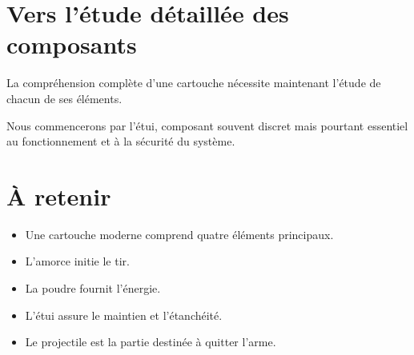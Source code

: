 \section{Vers l'étude détaillée des composants}

La compréhension complète d'une cartouche nécessite maintenant l'étude de
chacun de ses éléments.

Nous commencerons par l'étui, composant souvent discret mais pourtant
essentiel au fonctionnement et à la sécurité du système.

\section{À retenir}

\begin{aretenir}

\begin{itemize}
    \item Une cartouche moderne comprend quatre éléments principaux.
    \item L'amorce initie le tir.
    \item La poudre fournit l'énergie.
    \item L'étui assure le maintien et l'étanchéité.
    \item Le projectile est la partie destinée à quitter l'arme.
\end{itemize}

\end{aretenir}
